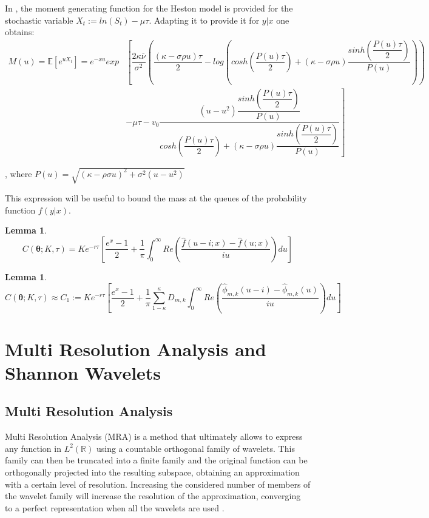 \documentclass[12,twoside]{mammeTFM}
\newtheorem{lem}[thm]{Lemma}
\theoremstyle{definition}
\theoremstyle{remark}
\newcommand{\R}{\ensuremath{\mathbb{R}}}
\begin{document}
In \cite{rol09}, the moment generating function for the Heston model is provided for the stochastic variable $X_t := ln(S_t) - \mu \tau$. Adapting it to provide it for $y|x$ one obtains:
\begin{equation}
\begin{aligned}
M(u)=\mathbb{E}\left[ e^{u X_{t}}\right] = e^{- x u} exp & \left[ \dfrac{2 \kappa \overline{\nu}}{\sigma^{2}} \left( \dfrac{(\kappa-\sigma \rho u) \tau}{2} - log \left(cosh \left(\dfrac{P(u) \tau}{2} \right)+(\kappa-\sigma \rho u) \dfrac{sinh \left(\dfrac{P(u) \tau}{2} \right)}{P(u)}\right) \right) \right. \\
& \left. -\mu \tau -v_{0} \dfrac{\left(u-u^{2}\right) \dfrac{sinh \left(\dfrac{P(u) \tau}{2} \right)}{P(u)}}{cosh \left(\dfrac{P(u) \tau}{2} \right)+(\kappa-\sigma \rho u) \dfrac{sinh \left(\dfrac{P(u) \tau}{2} \right)}{P(u)}} \right]
\end{aligned}
\end{equation}

, where $P(u)=\sqrt{(\kappa -\rho \sigma u)^{2}+\sigma^{2}\left(u-u^{2}\right)}$

This expression will be useful to bound the mass at the queues of the probability function $f(y|x)$.

\begin{lem} \label{lem:my_lemma}
\begin{equation}
C(\boldsymbol{\theta}; K, \tau) = Ke^{-r\tau} \left[ \dfrac{e^x - 1}{2} + \dfrac{1}{\pi} \int_0^{\infty} Re \left( \dfrac{\hat{f}(u - i; x) - \hat{f}(u; x)}{iu} \right) du \right]
\end{equation}
\end{lem}

\begin{lem} \label{lem:my_lemma_2}
\begin{equation}
C(\boldsymbol{\theta}; K, \tau) \approx C_1 :=  Ke^{-r\tau} \left[ \dfrac{e^x - 1}{2} + \dfrac{1}{\pi} \sum_{1 - \kappa}^{\kappa} D_{m,k} \int_0^{\infty} Re \left( \dfrac{\hat{\phi}_{m,k}(u - i) - \hat{\phi}_{m,k}(u)}{iu} \right) du \right]
\end{equation}
\end{lem}

\section{Multi Resolution Analysis and Shannon Wavelets}

\subsection{Multi Resolution Analysis} \label{def:mra}
Multi Resolution Analysis (MRA) is a method that ultimately allows to express any function in $L^2(\R)$ using a countable orthogonal family of wavelets. This family can then be truncated into a finite family and the original function can be orthogonally projected into the resulting subspace, obtaining an approximation with a certain level of resolution. Increasing the considered number of members of the wavelet family will increase the resolution of the approximation, converging to a perfect representation when all the wavelets are used \cite{tour}.
\end{document}
